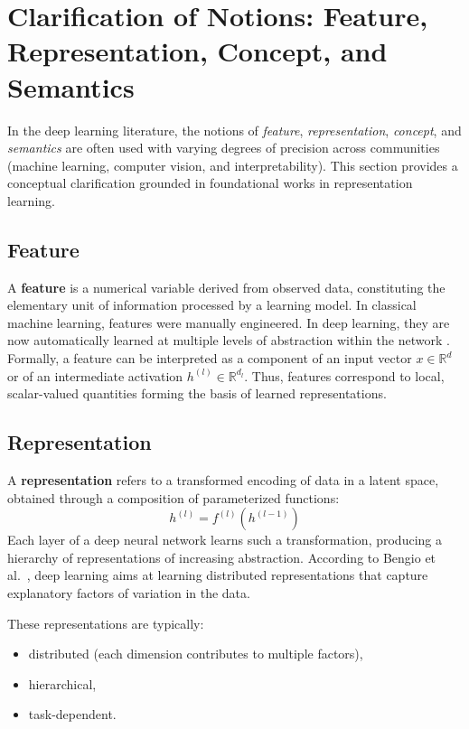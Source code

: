 \section{Clarification of Notions: Feature, Representation, Concept, and Semantics}

In the deep learning literature, the notions of \textit{feature}, \textit{representation}, \textit{concept}, and \textit{semantics} are often used with varying degrees of precision across communities (machine learning, computer vision, and interpretability).
This section provides a conceptual clarification grounded in foundational works in representation learning.

\subsection{Feature}

A \textbf{feature} is a numerical variable derived from observed data, constituting the elementary unit of information processed by a learning model.
In classical machine learning, features were manually engineered.
In deep learning, they are now automatically learned at multiple levels of abstraction within the network \cite{lecun2015deep}.
Formally, a feature can be interpreted as a component of an input vector $x \in \mathbb{R}^d$ or of an intermediate activation $h^{(l)} \in \mathbb{R}^{d_l}$.
Thus, features correspond to local, scalar-valued quantities forming the basis of learned representations.

\subsection{Representation}

A \textbf{representation} refers to a transformed encoding of data in a latent space, obtained through a composition of parameterized functions:
\[
h^{(l)} = f^{(l)}(h^{(l-1)})
\]
Each layer of a deep neural network learns such a transformation, producing a hierarchy of representations of increasing abstraction.
According to Bengio et al.~\cite{bengio2013representation}, deep learning aims at learning distributed representations that capture explanatory factors of variation in the data.

These representations are typically:
\begin{itemize}
    \item distributed (each dimension contributes to multiple factors),
    \item hierarchical,
    \item task-dependent.
\end{itemize}

